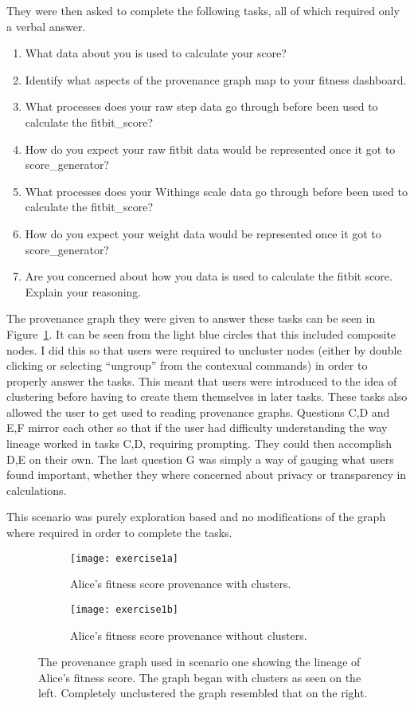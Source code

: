 They were then asked to complete the following tasks, all of which required only a verbal answer.
\begin{enumerate}
	\item What data about you is used to calculate your score?
	\item Identify what aspects of the provenance graph map to your fitness dashboard.
	\item What processes does your raw step data go through before been used to calculate the fitbit\_score?
	\item How do you expect your raw fitbit data would be represented once it got to score\_generator?
	\item What processes does your Withings scale data go through before been used to calculate the fitbit\_score?
	\item How do you expect your weight data would be represented once it got to score\_generator?
	\item Are you concerned about how you data is used to calculate the fitbit score. Explain your reasoning. 
\end{enumerate}

The provenance graph they were given to answer these tasks can be seen in Figure~\ref{fig:exercise1a}. It can be seen from the light blue circles that this included composite nodes. I did this so that users were required to uncluster nodes (either by double clicking or selecting ``ungroup'' from the contexual commands) in order to properly answer the tasks. This meant that users were introduced to the idea of clustering before having to create them themselves in later tasks. These tasks also allowed the user to get used to reading provenance graphs. Questions C,D and E,F mirror each other so that if the user had difficulty understanding the way lineage worked in tasks C,D, requiring prompting. They could then accomplish D,E on their own. The last question G was simply a way of gauging what users found important, whether they where concerned about privacy or transparency in calculations.

This scenario was purely exploration based and no modifications of the graph where required in order to complete the tasks.

\begin{figure}[h]
	\begin{subfigure}[t]{0.4\textwidth}
	\centering
	\texttt{[image: exercise1a]}
	\caption{Alice's fitness score provenance with clusters.}
	\label{fig:exercise1a}
	\end{subfigure}
	\begin{subfigure}[t]{0.4\textwidth}
	\centering
	\texttt{[image: exercise1b]}
	\caption{Alice's fitness score provenance without clusters.}
	\end{subfigure}
	\caption{The provenance graph used in scenario one showing the lineage of Alice's fitness score. The graph began with clusters as seen on the left. Completely unclustered the graph resembled that on the right.}
\end{figure}

